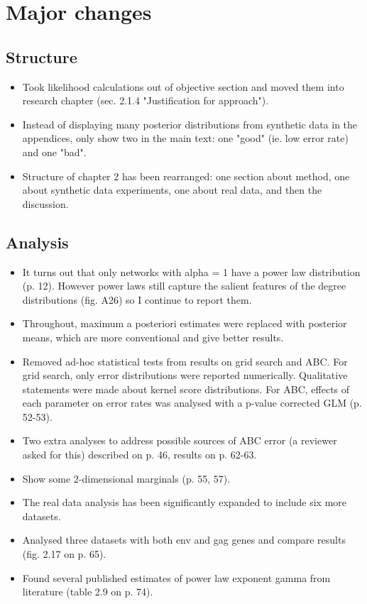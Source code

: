 \documentclass[11pt]{article}
\begin{document}
\section*{Major changes}

\subsection*{Structure}

\begin{itemize}
  \item Took likelihood calculations out of objective section and moved them
    into research chapter (sec. 2.1.4 "Justification for approach").
  \item Instead of displaying many posterior distributions from synthetic data 
    in the appendices, only show two in the main text: one "good" (ie. low
    error rate) and one "bad".
  \item Structure of chapter 2 has been rearranged: one section about method,
    one about synthetic data experiments, one about real data, and then the
    discussion. 
\end{itemize}

\subsection*{Analysis}

\begin{itemize}
  \item It turns out that only networks with alpha = 1 have a power law
    distribution (p. 12). However power laws still capture the salient features
    of the degree distributions (fig. A26) so I continue to report them.
  \item Throughout, maximum a posteriori estimates were replaced with posterior
    means, which are more conventional and give better results.
  \item Removed ad-hoc statistical tests from results on grid search and ABC.
    For grid search, only error distributions were reported numerically.
    Qualitative statements were made about kernel score distributions. For ABC,
    effects of each parameter on error rates was analysed with a p-value
    corrected GLM (p. 52-53).
  \item Two extra analyses to address possible sources of ABC error (a reviewer
    asked for this) described on p. 46, results on p. 62-63.
  \item Show some 2-dimensional marginals (p. 55, 57).
  \item The real data analysis has been significantly expanded to include six
    more datasets.
  \item Analysed three datasets with both env and gag genes and compare results
    (fig. 2.17 on p. 65).
  \item Found several published estimates of power law exponent gamma from
    literature (table 2.9 on p. 74). 
\end{itemize}
\end{document}
